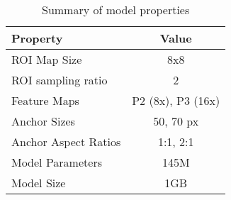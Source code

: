 \begin{table}[h]
    \centering
    \begin{tabular}{|l|c|}
        \hline
        \textbf{Property}    & \textbf{Value}    \\ \hline
        ROI Map Size         & 8x8               \\ \hline
        ROI sampling ratio   & 2                 \\ \hline
        Feature Maps         & P2 (8x), P3 (16x) \\ \hline
        Anchor Sizes         & 50, 70 px         \\ \hline
        Anchor Aspect Ratios & 1:1, 2:1          \\ \hline
        Model Parameters     & 145M              \\ \hline
        Model Size           & 1GB               \\ \hline
    \end{tabular}
    \caption{Summary of model properties}
    \label{tab:model_properties}
\end{table}


